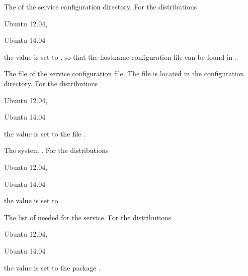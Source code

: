 The  of the service configuration directory.
For the distributions
\begin{inparaitem}
\item[\TheDistribution{ubuntu}] Ubuntu 12.04,
\item[\TheDistribution{ubuntu}] Ubuntu 14.04
\end{inparaitem}
the value is set to , so that the hostname configuration
file can be found in .


The file  of the service configuration file. The file is 
located in the configuration directory. For the distributions
\begin{inparaitem}
\item[\TheDistribution{ubuntu}] Ubuntu 12.04,
\item[\TheDistribution{ubuntu}] Ubuntu 14.04
\end{inparaitem}
the value is set to the file .


The system . 
For the distributions
\begin{inparaitem}
\item[\TheDistribution{ubuntu}] Ubuntu 12.04,
\item[\TheDistribution{ubuntu}] Ubuntu 14.04
\end{inparaitem}
the value is set to .


The list of  needed for the service.
For the distributions
\begin{inparaitem}
\item[\TheDistribution{ubuntu}] Ubuntu 12.04,
\item[\TheDistribution{ubuntu}] Ubuntu 14.04
\end{inparaitem}
the value is set to the package .


